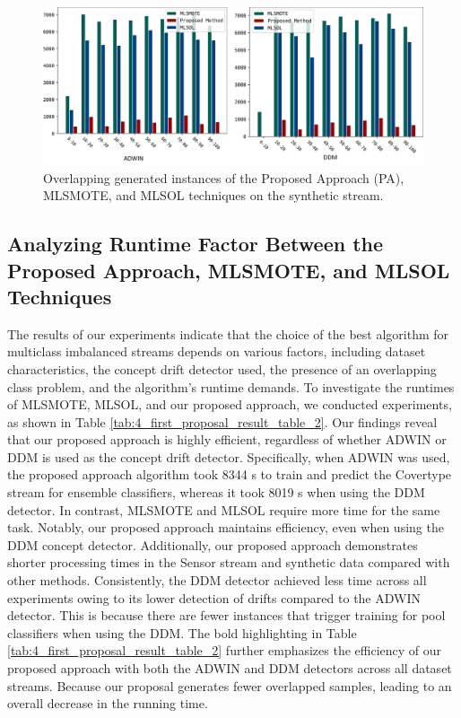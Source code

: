\begin{figure}[!ht]
	\centering
	\includegraphics[width=1\linewidth]{4_Imbalanced/figures/exp_9.png}
  \caption{Overlapping generated instances of the Proposed Approach (PA), MLSMOTE, and MLSOL techniques on the synthetic stream.}
	\label{fig:4_first_proposal_result_exp_9}
\end{figure}

\subsection{Analyzing Runtime Factor Between the Proposed Approach, MLSMOTE, and MLSOL Techniques}
The results of our experiments indicate that the choice of the best algorithm for multiclass imbalanced streams depends on various factors, including dataset characteristics, the concept drift detector used, the presence of an overlapping class problem, and the algorithm's runtime demands. To investigate the runtimes of MLSMOTE, MLSOL, and our proposed approach, we conducted experiments, as shown in Table \ref{tab:4_first_proposal_result_table_2}. Our findings reveal that our proposed approach is highly efficient, regardless of whether ADWIN or DDM is used as the concept drift detector. Specifically, when ADWIN was used, the proposed approach algorithm took 8344 s to train and predict the Covertype stream for ensemble classifiers, whereas it took 8019 s when using the DDM detector. In contrast, MLSMOTE and MLSOL require more time for the same task. Notably, our proposed approach maintains efficiency, even when using the DDM concept detector. Additionally, our proposed approach demonstrates shorter processing times in the Sensor stream and synthetic data compared with other methods. Consistently, the DDM detector achieved less time across all experiments owing to its lower detection of drifts compared to the ADWIN detector. This is because there are fewer instances that trigger training for pool classifiers when using the DDM. The bold highlighting in Table \ref{tab:4_first_proposal_result_table_2} further emphasizes the efficiency of our proposed approach with both the ADWIN and DDM detectors across all dataset streams. Because our proposal generates fewer overlapped samples, leading to an overall decrease in the running time.

